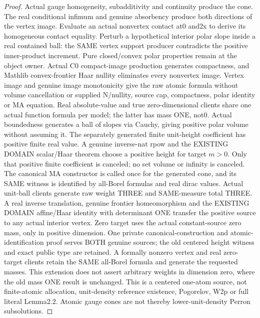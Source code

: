 \begin{proof}
  \leanok
  Actual gauge homogeneity, subadditivity and continuity produce the cone.
  The real conditional infimum and genuine absorbency produce both directions
  of the vertex image. Evaluate an actual nonvertex contact at0 and2x to
  derive its homogeneous contact equality. Perturb a hypothetical interior
  polar slope inside a real contained ball: the SAME vertex support producer
  contradicts the positive inner-product increment. Pure closed/convex polar
  properties remain at the object owner. Actual C0 compact-image production
  generates compactness, and Mathlib convex-frontier Haar nullity eliminates
  every nonvertex image. Vertex image and genuine image monotonicity give
  the raw atomic formula without volume cancellation or supplied N/nullity,
  source cap, compactness, polar identity or MA equation. Real absolute-value
  and true zero-dimensional clients share one actual function formula per
  model; the latter has mass ONE, not0. Actual boundedness generates a ball of slopes via Cauchy, giving positive polar volume without assuming it. The separately generated finite unit-height coefficient has positive finite real value. A genuine inverse-nat rpow and the EXISTING DOMAIN scalar/Haar theorem choose a positive height for target $m>0$. Only that positive finite coefficient is canceled; no set volume or infinity is canceled. The canonical MA constructor is called once for the generated cone, and its SAME witness is identified by all-Borel formulas and real dirac values. Actual unit-ball clients generate raw weight THREE and SAME-measure total THREE. A real inverse translation, genuine frontier homeomorphism and the EXISTING DOMAIN affine/Haar identity with determinant ONE transfer the positive source to any actual interior vertex. Zero target uses the actual constant-source zero mass, only in positive dimension. One private canonical-construction and atomic-identification proof serves BOTH genuine sources; the old centered height witness and exact public type are retained. A formally nonzero vertex and real zero-target clients retain the SAME all-Borel formula and generate the requested masses. This extension does not assert arbitrary weights in dimension zero, where the old mass ONE result is unchanged. This is a centered one-atom source, not finite-atomic allocation, unit-density reference existence, Pogorelov, W2p or full literal Lemma2.2.
  Atomic gauge cones are not thereby lower-unit-density Perron subsolutions.
\end{proof}

